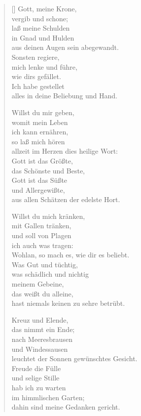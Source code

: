 \begin{multicols}{2}
\begin{verse}[\versewidth]
 Gott, meine Krone,\\
vergib und schone;\\
laß meine Schulden\\
in Gnad und Hulden\\
aus deinen Augen sein abegewandt.\\
Sonsten regiere,\\
mich lenke und führe,\\
wie dirs gefället.\\
Ich habe gestellet\\
alles in deine Beliebung und Hand.

 Willst du mir geben,\\
womit mein Leben\\
ich kann ernähren,\\
so laß mich hören\\
allzeit im Herzen dies heilige Wort:\\
Gott ist das Größte,\\
das Schönste und Beste,\\
Gott ist das Süßte\\
und Allergewißte,\\
aus allen Schätzen der edelste Hort.

\vfill\null
\columnbreak

 Willst du mich kränken,\\
mit Gallen tränken,\\
und soll von Plagen\\
ich auch was tragen:\\
Wohlan, so mach es, wie dir es beliebt.\\
Was Gut und tüchtig,\\
was schädlich und nichtig\\
meinem Gebeine,\\
das weißt du alleine,\\
hast niemals keinen zu sehre betrübt.

 Kreuz und Elende,\\
das nimmt ein Ende;\\
nach Meeresbrausen\\
und Windessausen\\
leuchtet der Sonnen gewünschtes Gesicht.\\
Freude die Fülle\\
und selige Stille\\
hab ich zu warten\\
im himmlischen Garten;\\
dahin sind meine Gedanken gericht.

\end{verse}
\end{multicols}
